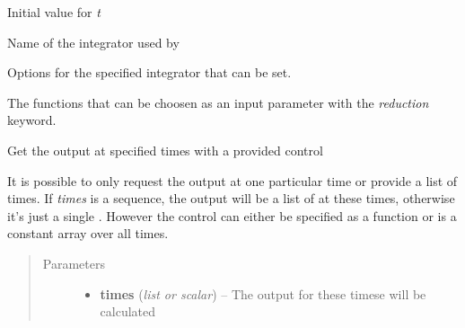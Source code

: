 \documentclass[letterpaper,10pt,english]{sphinxmanual}
\begin{document}
\begin{fulllineitems}
\begin{fulllineitems}
\end{fulllineitems}


\begin{fulllineitems}
\label{pod:pod.lss.t0}
Initial value for \emph{t}

\end{fulllineitems}


\begin{fulllineitems}
\label{pod:pod.lss.integrator}
Name of the integrator used by 

\end{fulllineitems}


\begin{fulllineitems}
\label{pod:pod.lss.integrator_options}
Options for the specified integrator that can be set.

\end{fulllineitems}


\begin{fulllineitems}
\label{pod:pod.lss.reduction_functions}
The functions that can be choosen as an input parameter with the
\emph{reduction} keyword.

\end{fulllineitems}


\begin{fulllineitems}
\label{pod:pod.lss.__call__}
Get the output at specified times with a provided control

It is possible to only request the output at one particular time
or provide a list of times. If \emph{times} is a sequence, the output
will be a list of  at these times, otherwise it's just
a single . However the control can either be specified as a
function or is a constant array over all times.
\begin{quote}\begin{description}
\item[{Parameters}] \leavevmode\begin{itemize}
\item {} 
\textbf{times} (\emph{list or scalar}) -- The output for these timese will be calculated


\end{itemize}
\end{description}
\end{quote}
\end{fulllineitems}
\end{fulllineitems}
\end{document}
